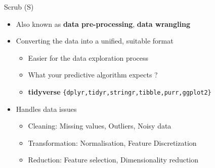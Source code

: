 \documentclass[12pt,ignorenonframetext,]{beamer}
\providecommand{\tightlist}{%
  \setlength{\itemsep}{0pt}\setlength{\parskip}{0pt}}
\begin{document}
\begin{frame}{Scrub (S)}
\protect\hypertarget{scrub-s}{}

\begin{itemize}
\tightlist
\item
  Also known as \textbf{data pre-processing}, \textbf{data wrangling}\\
  \vspace{2mm}
\item
  Converting the data into a unified, suitable format

  \begin{itemize}
      \item Easier for the data exploration process
      \item What your predictive algorithm expects ?
      \item \textbf{tidyverse} \texttt{\{dplyr,tidyr,stringr,tibble,purr,ggplot2\}}
  \end{itemize}
   \vspace{2mm}
\item
  Handles data issues

  \begin{itemize}
      \item Cleaning: Missing values, Outliers, Noisy data
      \item Transformation: Normalisation, Feature Discretization
      \item Reduction: Feature selection, Dimensionality reduction
  \end{itemize}
\end{itemize}

\end{frame}
\end{document}
